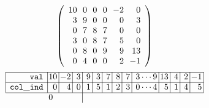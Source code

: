 \begin{figure}
\[
\left(
\begin{array}{r@{~~}r@{~~}r@{~~}r@{~~}r@{~~}r}
  10 & 0 & 0 & 0 & -2 & 0 \\
  3 & 9 & 0 & 0 & 0 & 3 \\
  0 & 7 & 8 & 7 & 0 & 0 \\
  3 & 0 & 8 & 7 & 5 & 0 \\
  0 & 8 & 0 & 9 & 9 & 13 \\
  0 & 4 & 0 & 0 & 2 & -1 \\
\end{array}
\right)
\]
\[
\begin{array}{c}
\begin{array}{|r|@{\hspace{1pt}}r@{\hspace{2pt}}|@{\hspace{1pt}}r@{\hspace{2pt}}|@{\hspace{1pt}}r@{\hspace{2pt}}|@{\hspace{1pt}}r@{\hspace{2pt}}|@{\hspace{1pt}}r@{\hspace{2pt}}|@{\hspace{1pt}}r@{\hspace{2pt}}|@{\hspace{1pt}}r@{\hspace{2pt}}|@{\hspace{1pt}}r@{\hspace{2pt}}|@{\hspace{1pt}}r@{\hspace{2pt}}|@{\hspace{1pt}}r@{\hspace{2pt}}|@{\hspace{1pt}}r@{\hspace{2pt}}|@{\hspace{1pt}}r@{\hspace{2pt}}|@{\hspace{1pt}}r@{\hspace{2pt}}|@{}l@{}}
  \cline{1-14}
\mathtt{val} & 10 & -2 & ~3 & ~9 & ~3 & ~7 & ~8 & ~7 & ~3 \cdots9 & 13 & ~4 & ~2 &
-1 \\
  \cline{1-14}
\mathtt{col\_ind} & 0 & 4 & 0 & 1 & 5 & 1 & 2 & 3 & 0 \cdots 4 &5 & 1 & 4 & 5 \\
  \cline{1-14}
  \multicolumn{1}{l}{} &
  \multicolumn{2}{@{}l}{\mbox{\scriptsize 0}} &

\end{array}
\end{array}\]
\end{figure}
